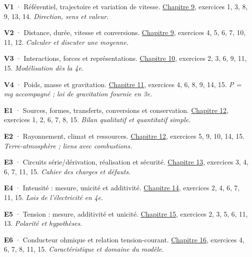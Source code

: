 \noindent\textbf{V1} · Référentiel, trajectoire et variation de vitesse. \hyperref[chap-9]{Chapitre 9}, exercices 1, 3, 8, 9, 13, 14. \emph{Direction, sens et valeur.}\par\vspace{2mm}
\noindent\textbf{V2} · Distance, durée, vitesse et conversions. \hyperref[chap-9]{Chapitre 9}, exercices 4, 5, 6, 7, 10, 11, 12. \emph{Calculer et discuter une moyenne.}\par\vspace{2mm}
\noindent\textbf{V3} · Interactions, forces et représentations. \hyperref[chap-10]{Chapitre 10}, exercices 2, 3, 6, 9, 11, 15. \emph{Modélisation dès la 4e.}\par\vspace{2mm}
\noindent\textbf{V4} · Poids, masse et gravitation. \hyperref[chap-11]{Chapitre 11}, exercices 4, 6, 8, 9, 14, 15. \emph{P = mg accompagné ; loi de gravitation fournie en 3e.}\par\vspace{2mm}
\noindent\textbf{E1} · Sources, formes, transferts, conversions et conservation. \hyperref[chap-12]{Chapitre 12}, exercices 1, 2, 6, 7, 8, 15. \emph{Bilan qualitatif et quantitatif simple.}\par\vspace{2mm}
\noindent\textbf{E2} · Rayonnement, climat et ressources. \hyperref[chap-12]{Chapitre 12}, exercices 5, 9, 10, 14, 15. \emph{Terre-atmosphère ; liens avec combustions.}\par\vspace{2mm}
\noindent\textbf{E3} · Circuits série/dérivation, réalisation et sécurité. \hyperref[chap-13]{Chapitre 13}, exercices 3, 4, 6, 7, 11, 15. \emph{Cahier des charges et défauts.}\par\vspace{2mm}
\noindent\textbf{E4} · Intensité : mesure, unicité et additivité. \hyperref[chap-14]{Chapitre 14}, exercices 2, 4, 6, 7, 11, 15. \emph{Lois de l’électricité en 4e.}\par\vspace{2mm}
\noindent\textbf{E5} · Tension : mesure, additivité et unicité. \hyperref[chap-15]{Chapitre 15}, exercices 2, 3, 5, 6, 11, 13. \emph{Polarité et hypothèses.}\par\vspace{2mm}
\noindent\textbf{E6} · Conducteur ohmique et relation tension-courant. \hyperref[chap-16]{Chapitre 16}, exercices 4, 6, 7, 8, 11, 15. \emph{Caractéristique et domaine du modèle.}\par\vspace{2mm}
